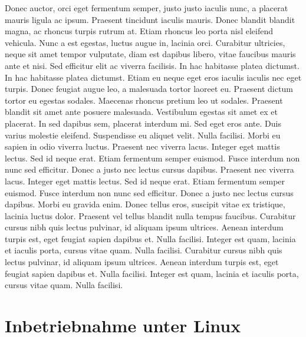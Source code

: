 Donec auctor, orci eget fermentum semper, justo justo iaculis nunc, a placerat mauris ligula ac ipsum. Praesent tincidunt iaculis mauris. Donec blandit blandit magna, ac rhoncus turpis rutrum at. Etiam rhoncus leo porta nisl eleifend vehicula. Nunc a est egestas, luctus augue in, lacinia orci. Curabitur ultricies, neque sit amet tempor vulputate, diam est dapibus libero, vitae faucibus mauris ante et nisi. Sed efficitur elit ac viverra facilisis. In hac habitasse platea dictumst. In hac habitasse platea dictumst. Etiam eu neque eget eros iaculis iaculis nec eget turpis.\newpar
Donec feugiat augue leo, a malesuada tortor laoreet eu. Praesent dictum tortor eu egestas sodales. Maecenas rhoncus pretium leo ut sodales. Praesent blandit sit amet ante posuere malesuada. Vestibulum egestas sit amet ex et placerat. In sed dapibus sem, placerat interdum mi. Sed eget eros ante. Duis varius molestie eleifend. Suspendisse eu aliquet velit. Nulla facilisi. Morbi eu sapien in odio viverra luctus. Praesent nec viverra lacus. Integer eget mattis lectus. Sed id neque erat. Etiam fermentum semper euismod. Fusce interdum non nunc sed efficitur. Donec a justo nec lectus cursus dapibus.\newpar
Praesent nec viverra lacus. Integer eget mattis lectus. Sed id neque erat. Etiam fermentum semper euismod. Fusce interdum non nunc sed efficitur. Donec a justo nec lectus cursus dapibus. Morbi eu gravida enim. Donec tellus eros, suscipit vitae ex tristique, lacinia luctus dolor. Praesent vel tellus blandit nulla tempus faucibus. Curabitur cursus nibh quis lectus pulvinar, id aliquam ipsum ultrices. Aenean interdum turpis est, eget feugiat sapien dapibus et. Nulla facilisi. Integer est quam, lacinia et iaculis porta, cursus vitae quam. Nulla facilisi. Curabitur cursus nibh quis lectus pulvinar, id aliquam ipsum ultrices. Aenean interdum turpis est, eget feugiat sapien dapibus et. Nulla facilisi. Integer est quam, lacinia et iaculis porta, cursus vitae quam. Nulla facilisi.

\section{Inbetriebnahme unter Linux}